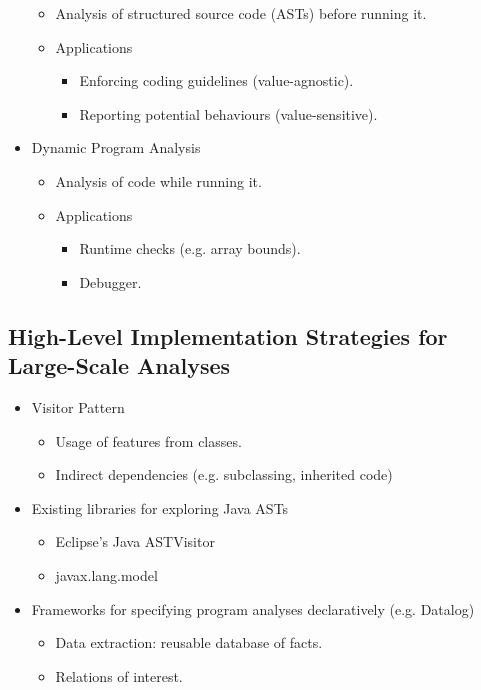 \documentclass{article}
\begin{document}
\begin{itemize}
    \begin{itemize}
        \item Analysis of structured source code (ASTs) before running it.
        \item Applications
        \begin{itemize}
            \item Enforcing coding guidelines (value-agnostic).
            \item Reporting potential behaviours (value-sensitive).
        \end{itemize}
    \end{itemize}
    \item Dynamic Program Analysis
    \begin{itemize}
        \item Analysis of code while running it.
        \item Applications
        \begin{itemize}
            \item Runtime checks (e.g. array bounds).
            \item Debugger.
        \end{itemize}
    \end{itemize}
\end{itemize}

\subsection{High-Level Implementation Strategies for Large-Scale Analyses}

\begin{itemize}
    \item Visitor Pattern
    \begin{itemize}
        \item Usage of features from classes.
        \item Indirect dependencies (e.g. subclassing, inherited code)
    \end{itemize}
    \item Existing libraries for exploring Java ASTs
    \begin{itemize}
        \item Eclipse's Java ASTVisitor
        \item javax.lang.model
    \end{itemize}
    \item Frameworks for specifying program analyses declaratively (e.g. Datalog)
    \begin{itemize}
        \item Data extraction: reusable database of facts.
        \item Relations of interest.
    \end{itemize}
\end{itemize}
\end{document}
